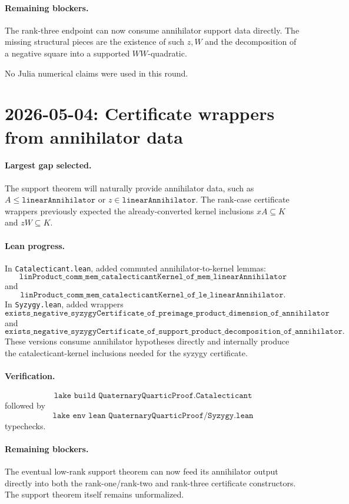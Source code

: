 \documentclass[11pt]{article}
\begin{document}
\paragraph{Remaining blockers.}
The rank-three endpoint can now consume annihilator support data directly.
The missing structural pieces are the existence of such \(z,W\) and the
decomposition of a negative square into a supported \(WW\)-quadratic.

No Julia numerical claims were used in this round.

\section*{2026-05-04: Certificate wrappers from annihilator data}

\paragraph{Largest gap selected.}
The support theorem will naturally provide annihilator data, such as
\(A\le\texttt{linearAnnihilator}\) or \(z\in\texttt{linearAnnihilator}\).
The rank-case certificate wrappers previously expected the already-converted
kernel inclusions \(xA\subseteq K\) and \(zW\subseteq K\).

\paragraph{Lean progress.}
In \texttt{Catalecticant.lean}, added commuted annihilator-to-kernel lemmas:
\[
\texttt{linProduct\_comm\_mem\_catalecticantKernel\_of\_mem\_linearAnnihilator}
\]
and
\[
\texttt{linProduct\_comm\_mem\_catalecticantKernel\_of\_le\_linearAnnihilator}.
\]
In \texttt{Syzygy.lean}, added wrappers
\[
\texttt{exists\_negative\_syzygyCertificate\_of\_preimage\_product\_dimension\_of\_annihilator}
\]
and
\[
\texttt{exists\_negative\_syzygyCertificate\_of\_support\_product\_decomposition\_of\_annihilator}.
\]
These versions consume annihilator hypotheses directly and internally produce
the catalecticant-kernel inclusions needed for the syzygy certificate.

\paragraph{Verification.}
\[
\texttt{lake build QuaternaryQuarticProof.Catalecticant}
\]
followed by
\[
\texttt{lake env lean QuaternaryQuarticProof/Syzygy.lean}
\]
typechecks.

\paragraph{Remaining blockers.}
The eventual low-rank support theorem can now feed its annihilator output
directly into both the rank-one/rank-two and rank-three certificate
constructors.  The support theorem itself remains unformalized.
\end{document}
